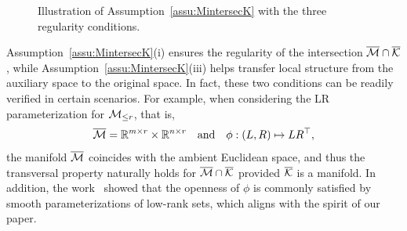 \begin{figure}[htbp]
    \vspace{0mm}
    \newcommand{\ratio}{0.5}
    \newcommand{\customrectangle}[7]{
            \draw[densely dashed, draw=#6, fill=#7] 
                (#1-#3/2, #2-#4/2) rectangle 
                (#1+#3/2, #2+#4/2); 
            \node at (#1, #2) {#5}; 
        }
    \begin{minipage}{1\textwidth}
    \begin{center}
    \end{center}
    \end{minipage}
    \caption{Illustration of Assumption~\ref{assu:MintersecK} with the three regularity conditions.}
    \label{fig:diagramMK}
\end{figure}

\begin{remark}
Assumption~\ref{assu:MintersecK}(i) ensures the regularity of the intersection $\overline{\mathcal{M}} \cap \overline{\mathcal{K}}$, while Assumption~\ref{assu:MintersecK}(iii) helps transfer local structure from the auxiliary space to the original space. In fact, these two conditions can be readily verified in certain scenarios. For example, when considering the LR parameterization for $\mathcal{M}_{\le r}$, that is, 
\begin{equation}\label{eq:MH_LR}
    \bmanifold = \mbR^{m\times r} \times \mbR^{n\times r}\ \ \ \text{and}\ \ \ \phi: (L,R)\mapsto LR^\top,
\end{equation}
the manifold $\overline{\mathcal{M}}$ coincides with the ambient Euclidean space, and thus the transversal property naturally holds for $\overline{\mathcal{M}}\cap\overline{\mathcal{K}}$ provided $\overline{\mathcal{K}}$ is a manifold. In addition, the work~\cite{levin2025effect} showed that the openness of $\phi$ is commonly satisfied by smooth parameterizations of low-rank sets, which aligns with the spirit of our paper.
\end{remark}


